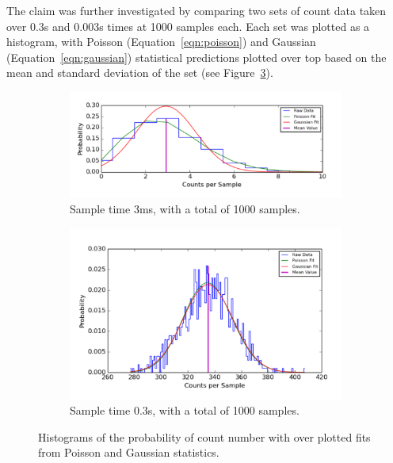 \documentclass[a4paper,12pt]{article}
\begin{document}
The claim was further investigated by comparing two sets of count data taken over 0.3s and 0.003s times at 1000 samples each. Each set was plotted as a histogram, with Poisson (Equation~\ref{eqn:poisson}) and Gaussian (Equation~\ref{eqn:gaussian}) statistical predictions plotted over top based on the mean and standard deviation of the set (see Figure~\ref{fig:section8}). 

\begin{figure}[h]
\centering
\begin{subfigure}{\textwidth}
  \centering
  \includegraphics[width=\linewidth]{3ms_section8_2_crop1.pdf}
  \vspace{-0.25in}
  \caption{Sample time 3ms, with a total of 1000 samples.}
  \label{fig:section8ms}
\end{subfigure}%
\qquad
\begin{subfigure}{\textwidth}
  \centering
  \includegraphics[width=\linewidth]{s_section8_2_crop1.pdf} 
  \vspace{-0.25in}
  \caption{Sample time 0.3s, with a total of 1000 samples.}
  \label{fig:section8s}
\end{subfigure}%
\caption{Histograms of the probability of count number with over plotted fits from Poisson and Gaussian statistics.}
\label{fig:section8}
\end{figure}
\end{document}
